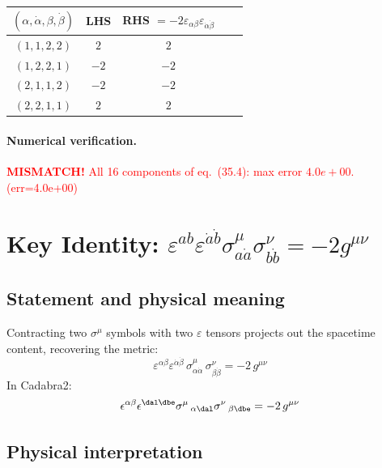 \documentclass[12pt]{article}
\begin{document}
\medskip
\begin{center}
\begin{tabular}{@{}ccccc@{}}
  \toprule
  $(\alpha,\dot\alpha,\beta,\dot\beta)$ &
  LHS & RHS $= -2\varepsilon_{\alpha\beta}\varepsilon_{\dot\alpha\dot\beta}$ \\
  \midrule
  $(1,1,2,2)$ & $2$ & $2$ \\
  $(1,2,2,1)$ & $-2$ & $-2$ \\
  $(2,1,1,2)$ & $-2$ & $-2$ \\
  $(2,2,1,1)$ & $2$ & $2$ \\
  \bottomrule
\end{tabular}
\end{center}

\paragraph{Numerical verification.}
\textcolor{red}{\textbf{MISMATCH!} All 16 components of eq.~(35.4): max error $4.0e+00$. (err=4.0e+00)}

\section{Key Identity:
         \texorpdfstring{$\varepsilon^{ab}\varepsilon^{\dot{a}\dot{b}}
         \sigma^\mu_{a\dot{a}}\sigma^\nu_{b\dot{b}} = -2g^{\mu\nu}$}{eq 35.5}
         \quad [eq.~35.5]}

\subsection{Statement and physical meaning}

Contracting two $\sigma^\mu$ symbols with two $\varepsilon$ tensors
projects out the spacetime content, recovering the metric:
\begin{equation}
  \boxed{
    \varepsilon^{\alpha\beta}\varepsilon^{\dot\alpha\dot\beta}\,
    \sigma^\mu_{\alpha\dot\alpha}\,\sigma^\nu_{\beta\dot\beta}
    = -2\,g^{\mu\nu}
  }
  \tag{35.5}
\end{equation}
In Cadabra2:
\[
  \epsilon^{\alpha \beta} \epsilon^{\dal \dbe} \sigma^{\mu}\,_{\alpha \dal} \sigma^{\nu}\,_{\beta \dbe} = -2\,g^{\mu \nu}
\]

\subsection{Physical interpretation}
\end{document}
